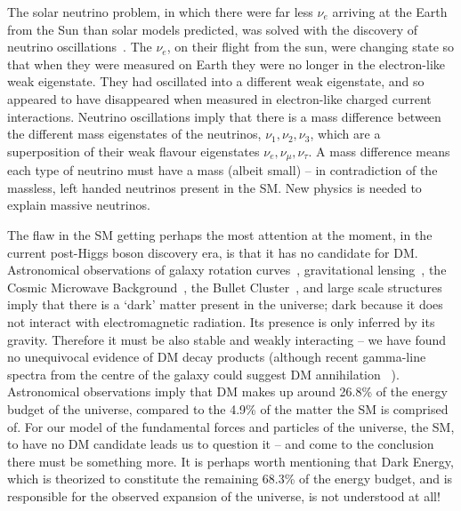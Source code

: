 %

The solar neutrino problem, in which there were far less $\nu_{e}$ arriving at the Earth from the Sun than solar models predicted, 
was solved with the discovery of neutrino oscillations~\cite{SolarNeut}. 
The $\nu_{e}$, on their flight from the sun, were changing state so that when they were measured on Earth they were no longer in the electron-like weak eigenstate. They had oscillated into a different weak eigenstate, and so appeared to have disappeared when measured in electron-like charged current interactions. 
Neutrino oscillations imply that there is a mass difference between the different mass eigenstates of the neutrinos, $\nu_{1}, \nu_{2}, \nu_{3}$, which are a superposition of their weak flavour eigenstates $\nu_{e}, \nu_{\mu}, \nu_{\tau}$.
A mass difference means each type of neutrino must have a mass (albeit small) -- in contradiction of the massless, left handed neutrinos present in the \ac{SM}.
New physics is needed to explain massive neutrinos.


The flaw in the \ac{SM} getting perhaps the most attention at the moment, in the current post-Higgs boson discovery era, is that it has no candidate for \ac{DM}. 
Astronomical observations of galaxy rotation curves~\cite{GalRotCurves}, gravitational lensing~\cite{GravLensing1,GravLensing2}, the Cosmic Microwave Background~\cite{Planck2013}, the Bullet Cluster~\cite{bulletCluster}, and large scale structures~\cite{LargeScaleStructuresDM} imply that there is a `dark' matter present in the universe; 
dark because it does not interact with electromagnetic radiation. 
Its presence is only inferred by its gravity. 
Therefore it must be also stable and weakly interacting -- we have found no unequivocal evidence of \ac{DM} decay products (although recent gamma-line spectra from the centre of the galaxy could suggest \ac{DM} annihilation~\cite{FermiDMgamma} ). 
Astronomical observations imply that \ac{DM} makes up around 26.8\% of the energy budget of the universe, compared to the 4.9\% of the matter the \ac{SM} is comprised of. 
For our model of the fundamental forces and particles of the universe, the \ac{SM}, 
to have no \ac{DM} candidate leads us to question it -- 
and come to the conclusion there must be something more.
It is perhaps worth mentioning that Dark Energy, 
which is theorized to constitute the remaining 68.3\% of the energy budget, 
and is responsible for the observed expansion of the universe, is not understood at all!


